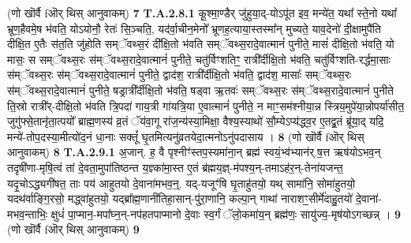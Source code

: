 \documentclass[17pt]{extarticle}
\begin{document}
                  \newline
                                                        (णो खॊर्वै fऒर् थिस् आनुवाकम्) \textbf{7} \newline \newline
                                \textbf{ T.A.2.8.1} \newline
                  कू॒श्मा॒ण्डैर् जु॑हुया॒द्-योऽपू॑त इव॒ मन्ये॑त॒ यथा᳚ स्ते॒नो यथा᳚ भ्रूण॒हैवमे॒ष भ॑वति॒ योऽयोनौ॒ रेतः॑ सि॒ञ्चति॒, यद॑र्वा॒चीन॒मेनो᳚ भ्रूणह॒त्याया॒स्तस्मा᳚न् मुच्यते॒ याव॒देनो॑ दी॒क्षामुपै॑ति दीक्षि॒त ए॒तैः स॑त॒ति जु॑होति सम्ॅवथ्स॒रं दी᳚क्षि॒तो भ॑वति सम्ॅवथ्स॒रादे॒वात्मानं॑ पुनीते॒ मासं॑ दीक्षि॒तो भ॑वति॒ यो मासः॒ स सम्ॅवथ्स॒रः स॑म्ॅवथ्स॒रादे॒वात्मानं॑ पुनीते॒ चतु॑र्विꣳशतिꣳ॒॒ रात्री᳚र्दीक्षि॒तो भ॑वति॒ चतु॑र्विꣳशति-रर्द्धमा॒साः स॑म्ॅवथ्स॒रः स॑म्ॅवथ्स॒रादे॒वात्मानं॑ पुनीते॒ द्वाद॑श॒ रात्री᳚र्दीक्षि॒तो भ॑वति॒ द्वाद॑श॒ मासाः᳚ सम्ॅवथ्स॒रः स॑म्ॅवथ्स॒रादे॒वात्मानं॑ पुनीते॒ षड्रात्री᳚र्दीक्षि॒तो भ॑वति॒ षड्वा ऋ॒तवः॑ सम्ॅवथ्स॒रः स॑म्ॅवथ्स॒रादे॒वात्मानं॑ पुनीते ति॒स्रो रात्री᳚र्-दीक्षि॒तो भ॑वति त्रि॒पदा॑ गाय॒त्री गा॑यत्रि॒या ए॒वात्मानं॑ पुनीते॒ न माꣳ॒॒सम॑श्नीया॒न्न स्त्रिय॒मुपे॑या॒न्नोपर्या॑सीत॒ जुगु॑फ्से॒तानृ॑ता॒त्पयो᳚ ब्राह्म॒णस्य॑ व्र॒तं ॅय॑वा॒गू रा॑ज॒न्य॑स्या॒मिक्षा॒ वैश्य॒स्याथो॑ सौ॒म्येऽप्य॑द्ध्व॒र ए॒तद्व्र॒तं ब्रू॑या॒द् यदि॒ मन्ये॑-तोप॒दस्या॒मीत्यो॑द॒नं धा॒नाः सक्तूं᳚ घृ॒तमित्यनु॑व्रतयेदा॒त्मनोऽनु॑पदासाय । \textbf{ 8} \newline
                  \newline
                                                        (णो खॊर्वै fऒर् थिस् आनुवाकम्) \textbf{8} \newline \newline
                                \textbf{ T.A.2.9.1} \newline
                  अ॒जान्. ह॒ वै पृश्नीꣳ॑स्तप॒स्यमा॑ना॒न् ब्रह्म॑ स्वयं॒भ्व॑भ्यान॑र्.ष॒त्त ऋष॑योऽभव॒न् तदृषी॑णा-मृषि॒त्वं तां दे॒वता॒मुपा॑तिष्ठन्त य॒ज्ञ्का॑मा॒स्त ए॒तं ब्र॑ह्मय॒ज्ञ्-म॑पश्य॒न्-तमाऽह॑र॒न्-तेना॑यजन्त॒ यदृ॒चोऽद्ध्यगी॑षत॒ ताः पय॑ आहुतयो दे॒वाना॑मभव॒न्॒. यद्-यजूꣳ॑षि घृ॒ताहु॑तयो॒ यथ् सामा॑नि॒ सोमा॑हुतयो॒ यदथ॑र्वाङ्गि॒रसो॒ मद्ध्वा॑हुतयो॒ यद्ब्रा᳚ह्म॒णानी॑तिहा॒सान्-पु॑रा॒णानि॒ कल्पा॒न् गाथा॑ नाराशꣳ॒॒सीर्मे॑दाहु॒तयो॑ दे॒वाना॑-मभव॒न्ताभिः॒ क्षुधं॑ पा॒प्मान॒-मपा᳚घ्न॒न्-नप॑हतपाप्मानो दे॒वाः स्व॒र्गं ॅलो॒कमा॑य॒न् ब्रह्म॑णः॒ सायु॑ज्य॒-मृष॑योऽगच्छन्न् । \textbf{ 9} \newline
                  \newline
                                                        (णो खॊर्वै fऒर् थिस् आनुवाकम्) \textbf{9} \newline \newline
\end{document}
